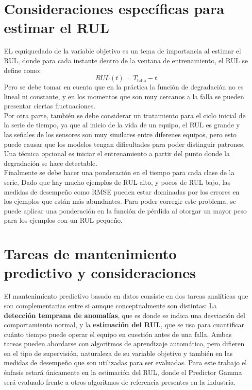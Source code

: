 \section{Consideraciones específicas para estimar el RUL}

EL equiquedado de la variable objetivo es un tema de importancia al estimar el RUL, donde para cada instante dentro de la ventana de entrenamiento, el RUL se define como:
\[
RUL(t) = T_{\text{falla}} - t
\]
Pero se debe tomar en cuenta que en la práctica la función de degradación no es lineal ni constante, y en los momentos que son muy cercanos a la falla se pueden presentar ciertas fluctuaciones.\\[.15cm]

Por otra parte, también se debe considerar un tratamiento para el ciclo inicial de la serie de tiempo, ya que al inicio de la vida de un equipo, el RUL es grande y las señales de los sensores son muy similares entre diferenes equipos, pero esto puede causar que los modelos tengan dificultades para poder distinguir patrones. Una técnica opcional es iniciar el entrenamiento a partir del punto donde la degradación se hace detectable.\\[.15cm]

Finalmente se debe hacer una ponderación en el tiempo para cada clase de la serie, Dado que hay mucho ejemplos de RUL alto, y pocos de RUL bajo, las medidas de desempeño como RMSE pueden estar dominadas por los errores en los ejemplos que están más abundantes. Para poder corregir este problema, se puede aplicar una ponderación en la función de pérdida al otorgar un mayor peso para los ejemplos con un RUL pequeño.

\section{Tareas de mantenimiento predictivo y consideraciones}

El mantenimiento predictivo basado en datos consiste en dos tareas analíticas que son complementarias entre si aunque conceptualmente son distintas: La \textbf{detección temprana de anomalías}, que es donde se indica una desviación del comportamiento normal, y la \textbf{estimación del RUL}, que se usa para cuantificar cuánto tiempo puede operar el equipo en cuestión antes de una falla. Ambas tareas pueden abordarse con algoritmos de aprendizaje automático, pero difieren en el tipo de supervisión, naturaleza de su variable objetivo y también en las medidas de desempeño que son utilizadas para ser evaluadas. Para este trabajo el énfasis estará únicamente en la estimación del RUL, donde el Predictor Gamma será evaluado frente a otros algoritmos de referencia presentes en la industria.

